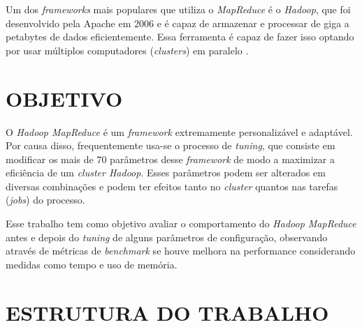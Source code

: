 Um dos \textit{frameworks} mais populares que utiliza o \textit{MapReduce} é o \textit{Hadoop}, que foi desenvolvido pela Apache em 2006 e é capaz de armazenar e processar de giga a petabytes de dados eficientemente. Essa ferramenta é capaz de fazer isso optando por usar múltiplos computadores (\textit{clusters}) em paralelo \cite{HadoopBook15}.

\section{OBJETIVO} \label{sec:objetivo}

O \textit{Hadoop MapReduce} é um \textit{framework} extremamente personalizável e adaptável. Por causa disso, frequentemente usa-se o processo de \textit{tuning}, que consiste em modificar os mais de 70 parâmetros desse \textit{framework} de modo a maximizar a eficiência de um \textit{cluster Hadoop}. Esses parâmetros podem ser alterados em diversas combinações e podem ter efeitos tanto no \textit{cluster} quantos nas tarefas (\textit{jobs}) do processo.

Esse trabalho tem como objetivo avaliar o comportamento do \textit{Hadoop MapReduce} antes e depois do \textit{tuning} de alguns parâmetros de configuração, observando através de métricas de \textit{benchmark} se houve melhora na performance considerando medidas como tempo e uso de memória.

\section{ESTRUTURA DO TRABALHO} \label{sec:estrtura}

